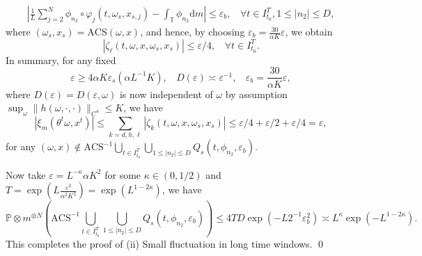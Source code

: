 \documentclass[a4paper]{article}
\theoremstyle{plain}
\theoremstyle{definition}
\newcommand{\PP}{\mathbb{P}}
\newcommand{\T}{\mathbb{T}}
\begin{document}
\begin{align*}
	\left|\frac{1}{L}\sum_{j=2}^N \phi_{n_2}\circ \varphi_j(t,\omega_{{s}},x_{{s},j}) - \int_{\T} \phi_{n_2}\mathrm{d}m\right| \leq \varepsilon_b,~~~~\forall t\in I_{t_0}^T,1\leq|n_2|\leq D,
\end{align*}
where $(\omega_{{s}},x_{{s}})=\mathrm{ACS}(\omega,x)$, and hence, by choosing $\varepsilon_b=\frac{30}{\alpha K}\varepsilon$, we obtain
$$|\zeta_{\ell}(t,\omega,x,\omega_{{s}},x_{{s}})|\leq \varepsilon/4,~~~~\forall t\in I_{t_0}^T.$$
In summary, for any fixed $$\varepsilon\geq 4\alpha K \varepsilon_s (\alpha L^{-1} K),~~~~D(\varepsilon)\asymp \varepsilon^{-1},~~~~\varepsilon_b=\frac{30}{\alpha K}\varepsilon,$$ 
where $D(\varepsilon)=D(\varepsilon,\omega)$ is now independent of $\omega$ by assumption $\sup_{\omega} \|h(\omega,\cdot,\cdot)\|_{C^4}\leq K$, we have
$$|\xi_{m}(\theta^t\omega,x^t)| \leq \sum_{k=d,h,\ell}|\zeta_k(t,\omega,x,\omega_{{s}},x_{{s}})| \leq \varepsilon/4 + \varepsilon/2 + \varepsilon/4=\varepsilon,$$
for any $(\omega,x)\notin \mathrm{ACS}^{-1}\bigcup_{t\in I_{t_0}^T} \bigcup_{1\leq |n_2|\leq D} Q_{{s}}(t,\phi_{n_2},\varepsilon_b)$. 

Now take $\varepsilon= L^{-\kappa}\alpha K^2$ for some $\kappa\in(0,1/2)$ and $T=\exp\left(L \frac{\varepsilon^2}{\alpha^2 K^2}\right)= \exp(L^{1-2\kappa})$, we have 
$$	\PP\otimes m^{\otimes N} \left(\mathrm{ACS}^{-1}\bigcup_{t\in I_{t_0}^T} \bigcup_{1\leq |n_2|\leq D} Q_{{s}}(t,\phi_{n_2},\varepsilon_b)\right)\leq 4TD\exp(-L2^{-1}\varepsilon_b^2)\asymp L^{\kappa} \exp(-L^{1-2\kappa}).$$
This completes the proof of (ii) Small fluctuation in long time windows. \qed
\end{document}

